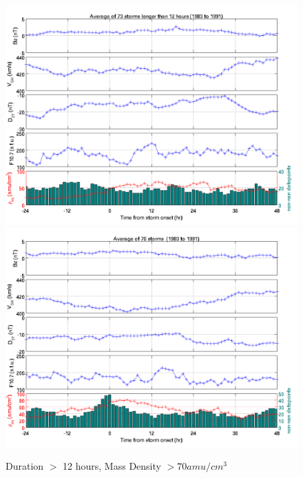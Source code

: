 \documentclass[10pt,twocolumn]{article}
\begin{document}
\begin{figure}[htp!]
\centering
\includegraphics[scale=0.7]{paperfigures/stormavs-md12.png}
\includegraphics[scale=0.7]{paperfigures/stormavs-m70.png}
\caption{Duration $>$ 12 hours, Mass Density $>70 amu/cm^3$}
\label{Mspec}
\end{figure}
\clearpage
\end{document}
